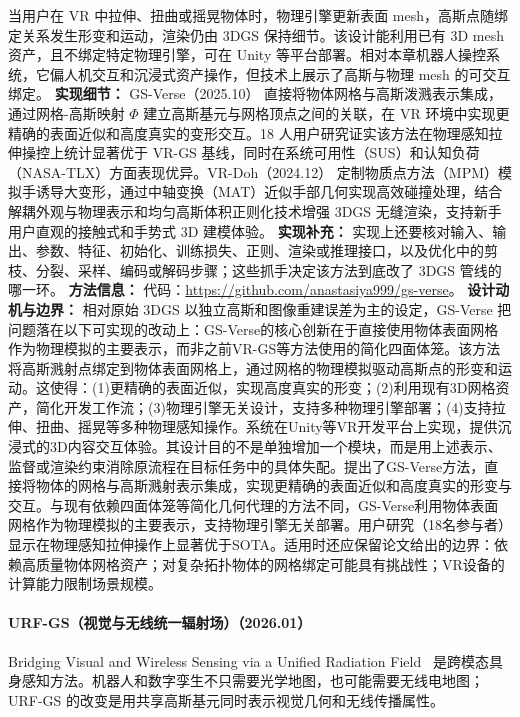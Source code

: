 当用户在 VR 中拉伸、扭曲或摇晃物体时，物理引擎更新表面 mesh，高斯点随绑定关系发生形变和运动，渲染仍由 3DGS 保持细节。该设计能利用已有 3D mesh 资产，且不绑定特定物理引擎，可在 Unity 等平台部署。相对本章机器人操控系统，它偏人机交互和沉浸式资产操作，但技术上展示了高斯与物理 mesh 的可交互绑定。
\textbf{实现细节：} GS-Verse（2025.10） 直接将物体网格与高斯泼溅表示集成，通过网格-高斯映射 $\Phi$ 建立高斯基元与网格顶点之间的关联，在 VR 环境中实现更精确的表面近似和高度真实的变形交互。18 人用户研究证实该方法在物理感知拉伸操控上统计显著优于 VR-GS 基线，同时在系统可用性（SUS）和认知负荷（NASA-TLX）方面表现优异。VR-Doh（2024.12） 定制物质点方法（MPM）模拟手诱导大变形，通过中轴变换（MAT）近似手部几何实现高效碰撞处理，结合解耦外观与物理表示和均匀高斯体积正则化技术增强 3DGS 无缝渲染，支持新手用户直观的接触式和手势式 3D 建模体验。
\textbf{实现补充：} 实现上还要核对输入、输出、参数、特征、初始化、训练损失、正则、渲染或推理接口，以及优化中的剪枝、分裂、采样、编码或解码步骤；这些抓手决定该方法到底改了 3DGS 管线的哪一环。
\textbf{方法信息：} 代码：\url{https://github.com/anastasiya999/gs-verse}。
\textbf{设计动机与边界：} 相对原始 3DGS 以独立高斯和图像重建误差为主的设定，GS-Verse 把问题落在以下可实现的改动上：GS-Verse的核心创新在于直接使用物体表面网格作为物理模拟的主要表示，而非之前VR-GS等方法使用的简化四面体笼。该方法将高斯溅射点绑定到物体表面网格上，通过网格的物理模拟驱动高斯点的形变和运动。这使得：(1)更精确的表面近似，实现高度真实的形变；(2)利用现有3D网格资产，简化开发工作流；(3)物理引擎无关设计，支持多种物理引擎部署；(4)支持拉伸、扭曲、摇晃等多种物理感知操作。系统在Unity等VR开发平台上实现，提供沉浸式的3D内容交互体验。其设计目的不是单独增加一个模块，而是用上述表示、监督或渲染约束消除原流程在目标任务中的具体失配。提出了GS-Verse方法，直接将物体的网格与高斯溅射表示集成，实现更精确的表面近似和高度真实的形变与交互。与现有依赖四面体笼等简化几何代理的方法不同，GS-Verse利用物体表面网格作为物理模拟的主要表示，支持物理引擎无关部署。用户研究（18名参与者）显示在物理感知拉伸操作上显著优于SOTA。适用时还应保留论文给出的边界：依赖高质量物体网格资产；对复杂拓扑物体的网格绑定可能具有挑战性；VR设备的计算能力限制场景规模。
\paragraph{URF-GS（视觉与无线统一辐射场）（2026.01）}
Bridging Visual and Wireless Sensing via a Unified Radiation Field~\cite{2601_19216} 是跨模态具身感知方法。机器人和数字孪生不只需要光学地图，也可能需要无线电地图；URF-GS 的改变是用共享高斯基元同时表示视觉几何和无线传播属性。

